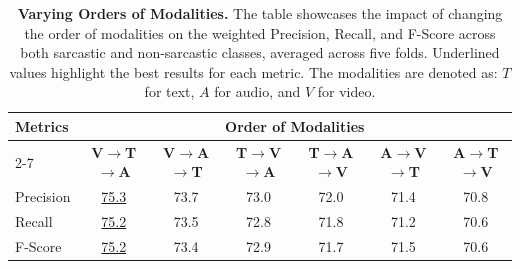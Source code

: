 \begin{table}[htb]
\setlength{\abovecaptionskip}{0.3 cm}
\setlength{\belowcaptionskip}{-0.3 cm} 
\renewcommand{\arraystretch}{1.26}
\centering
\setlength\tabcolsep{9.36 pt}
\begin{tabular}{@{}lcccccc@{}}
\toprule\toprule
\multirow{2}{*}{\textbf{Metrics}} & \multicolumn{6}{c}{\textbf{Order of Modalities}} \\ 
\cmidrule(lr){2-7} 
& \textbf{V$\rightarrow$T$\rightarrow$A} & \textbf{V$\rightarrow$A$\rightarrow$T} & \textbf{T$\rightarrow$V$\rightarrow$A} & \textbf{T$\rightarrow$A$\rightarrow$V} & \textbf{A$\rightarrow$V$\rightarrow$T} & \textbf{A$\rightarrow$T$\rightarrow$V} \\
\midrule
Precision & \uline{75.3} & 73.7 & 73.0 & 72.0 & 71.4 & 70.8 \\
Recall & \uline{75.2} & 73.5 & 72.8 & 71.8 & 71.2 & 70.6 \\
F-Score & \uline{75.2} & 73.4 & 72.9 & 71.7 & 71.5 & 70.6 \\
\bottomrule\bottomrule
\end{tabular}
\caption{\textbf{Varying Orders of Modalities.} The table showcases the impact of changing the order of modalities on the weighted Precision, Recall, and F-Score across both sarcastic and non-sarcastic classes, averaged across five folds. Underlined values highlight the best results for each metric. The modalities are denoted as: $T$ for text, $A$ for audio, and $V$ for video.}
\label{tab:modalities_order}
\end{table}
